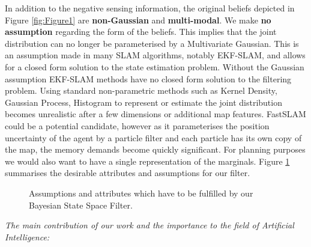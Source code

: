 In addition to the negative sensing information, the original beliefs depicted in Figure \ref{fig:Figure1} are \textbf{non-Gaussian}
and \textbf{multi-modal}. We make \textbf{no assumption} regarding the form of the beliefs. This implies that the joint distribution 
can no longer be parameterised by a Multivariate Gaussian. 
This is an assumption made in many SLAM algorithms, notably EKF-SLAM, and allows for a closed form solution to the state estimation problem. Without the 
Gaussian assumption EKF-SLAM methods have no closed form solution to the filtering problem. 
Using standard non-parametric methods such as Kernel Density, Gaussian Process, Histogram to represent or estimate the joint distribution becomes
unrealistic after a few dimensions or additional map features. 
FastSLAM could be a potential candidate, however as it parameterises the position uncertainty of the agent by a particle filter and each
particle has its own copy of the map, the memory demands become quickly significant.  For planning purposes we would also want to have a 
single representation of the marginals. Figure \ref{fig:ch5_assmuptions} summarises the desirable attributes and assumptions for our filter.

\begin{figure}
\centering
{}%
\caption{Assumptions and attributes which have to be fulfilled by our Bayesian State Space Filter. }
 \label{fig:ch5_assmuptions}
\end{figure}

\textit{The main contribution of our work and the importance to the field of Artificial Intelligence:} 


